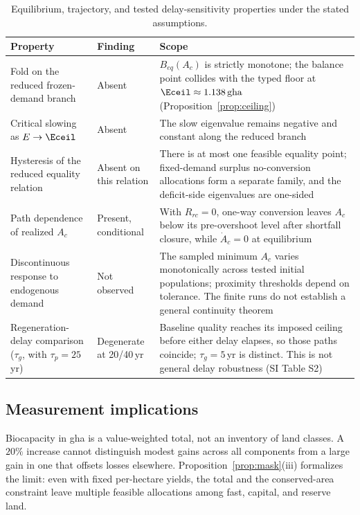 \begin{table}[!htbp]
\centering\footnotesize
\caption{Equilibrium, trajectory, and tested delay-sensitivity properties under the stated assumptions.}
\label{tab:neg}
\begin{tabularx}{\textwidth}{>{\raggedright\arraybackslash}p{} l >{\raggedright\arraybackslash}X}
\toprule
Property & Finding & Scope \\
\midrule
Fold on the reduced frozen-demand branch & Absent & $B_{eq}(A_c)$ is strictly monotone; the balance point collides with the typed floor at $\Eceil\approx1.138\,\mathrm{gha}$ (Proposition~\ref{prop:ceiling}) \\
Critical slowing as $E\to\Eceil$ & Absent & The slow eigenvalue remains negative and constant along the reduced branch \\
Hysteresis of the reduced equality relation & Absent on this relation & There is at most one feasible equality point; fixed-demand surplus no-conversion allocations form a separate family, and the deficit-side eigenvalues are one-sided \\
Path dependence of realized $A_c$ & Present, conditional & With $R_{rc}=0$, one-way conversion leaves $A_c$ below its pre-overshoot level after shortfall closure, while $\dot A_c=0$ at equilibrium \\
Discontinuous response to endogenous demand & Not observed & The sampled minimum $A_c$ varies monotonically across tested initial populations; proximity thresholds depend on tolerance. The finite runs do not establish a general continuity theorem \\
Regeneration-delay comparison ($\tau_g$, with $\tau_p=25$\,yr) & Degenerate at 20/40\,yr & Baseline quality reaches its imposed ceiling before either delay elapses, so those paths coincide; $\tau_g=5$\,yr is distinct. This is not general delay robustness (SI Table S2) \\
\bottomrule
\end{tabularx}
\end{table}
\clearpage

\subsection{Measurement implications}

Biocapacity in gha is a value-weighted total, not an inventory of land classes. A $20\%$ increase cannot distinguish modest gains across all components from a large gain in one that offsets losses elsewhere. Proposition~\ref{prop:mask}(iii) formalizes the limit: even with fixed per-hectare yields, the total and the conserved-area constraint leave multiple feasible allocations among fast, capital, and reserve land.


